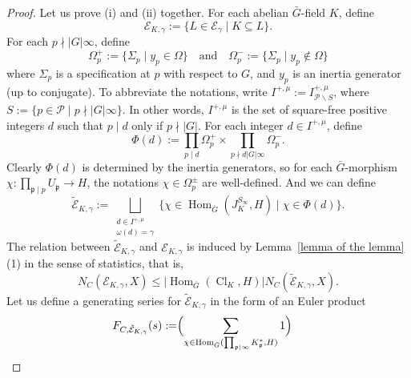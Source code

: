 \documentclass{amsart}
\numberwithin{equation}{section}
\theoremstyle{plain}
\theoremstyle{definition}
\theoremstyle{remark}
\begin{document}
\begin{proof}
	Let us prove (i) and (ii) together.
	For each abelian $\bar{G}$-field $K$, define
	\begin{equation*}
		\mathcal{E}_{K,\gamma}:=\{L\in\mathcal{E}_{\gamma}\mid K\subseteq L\}.
	\end{equation*}
	For each $p\nmid\lvert G\rvert\infty$, define
	\begin{equation*}
		\Omega_p^+:=\{\Sigma_p\mid y_p\in\Omega\}
		\quad\text{and}\quad
		\Omega_p^-:=\{\Sigma_p\mid y_p\notin\Omega\}
	\end{equation*}
	where $\Sigma_p$ is a specification at $p$ with respect to $G$, and $y_p$ is an inertia generator (up to conjugate).
	To abbreviate the notations, write $I^{+,\mu}:=I^{+,\mu}_{\mathcal{P}\backslash S}$, where $S:=\{p\in\mathcal{P}\mid p\nmid\lvert G\rvert\infty\}$.
	In other words, $I^{+,\mu}$ is the set of square-free positive integers $d$ such that $p\mid d$ only if $p\nmid\lvert G\rvert$.
	For each integer $d\in I^{+,\mu}$, define
	\begin{equation*}
		\Phi(d):=\prod_{p\mid d}\Omega_p^+\times\prod_{p\nmid d\lvert G\rvert\infty}\Omega_p^-.
	\end{equation*}
	Clearly $\Phi(d)$ is determined by the inertia generators, so for each $\bar{G}$-morphism $\chi:\prod_{\mathfrak{p}\mid p}U_{\mathfrak{p}}\to H$, the notations $\chi\in\Omega_p^{\pm}$ are well-defined. 
	And we can define
	\begin{equation*}
		\tilde{\mathcal{E}}_{K,\gamma}:=
		\bigsqcup_{
			\substack{
				d\in I^{+,\mu}\\
				\omega(d)=\gamma
			}
		}\{\chi\in\operatorname{Hom}_{\bar{G}}(J_K^{S_{\infty}},H)\mid\chi\in\Phi(d)\}.
	\end{equation*}
	The relation between $\tilde{\mathcal{E}}_{K,\gamma}$ and $\mathcal{E}_{K,\gamma}$ is induced by Lemma~\ref{lemma of the lemma}(1) in the sense of statistics, that is,
	\begin{equation*}
		N_C(\mathcal{E}_{K,\gamma},X)\leq\lvert\operatorname{Hom}_{\bar{G}}(\operatorname{Cl}_K,H)\rvert N_C(\tilde{\mathcal{E}}_{K,\gamma},X).
	\end{equation*}
	Let us define a generating series for $\tilde{\mathcal{E}}_{K,\gamma}$ in the form of an Euler product
	\begin{equation*}
		\begin{aligned}
			F_{C,\tilde{\mathcal{E}}_{K,\gamma}}(s):=
			&\Bigl(\sum_{\chi\in\operatorname{Hom}_{\bar{G}}(\prod_{\mathfrak{p}\mid\infty}K_{\mathfrak{p}}^*,H)}1\Bigr)

\end{aligned}
\end{equation*}
\end{proof}
\end{document}
